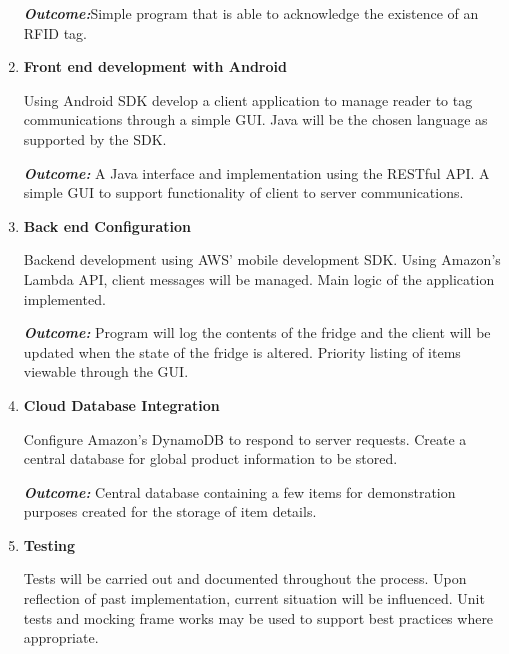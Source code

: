 \documentclass[a4paper, 11pt]{article}
\begin{document}
\begin{enumerate}
\begin{flushleft}
	\emph{\textbf{Outcome:}}Simple program that is able to acknowledge the existence of an RFID tag. 
		  \vspace{\baselineskip}

  	\end{flushleft}
	   \item \textbf{Front end development with Android}
   	\begin{flushleft}Using Android SDK develop a client application to manage reader to tag communications through a simple GUI. Java will be the chosen language as supported by the SDK.
	
	\emph{\textbf{Outcome:}} A Java interface and implementation using the RESTful API. A simple GUI to support functionality of client to server communications. 
	\end{flushleft}
	\vspace{\baselineskip}
 
   \item \textbf{Back end Configuration }
   	\begin{flushleft}Backend development using AWS' mobile development SDK. Using Amazon's Lambda API, client messages will be managed. Main logic of the application implemented.
	
	\emph{\textbf{Outcome:}} Program will log the contents of the fridge and the client will be updated when the state of the fridge is altered. Priority listing of items viewable through the GUI.  
	\vspace{\baselineskip}
  	\end{flushleft}
	   \item \textbf{Cloud Database Integration}
   	\begin{flushleft} Configure Amazon's DynamoDB to respond to server requests. Create a central database for global product information to be stored.
	
	\emph{\textbf{Outcome:}} Central database containing a few items for demonstration purposes created for the storage of item details. 
	\vspace{\baselineskip}
  	\end{flushleft}
	 
   \item \textbf{Testing}
   	\begin{flushleft}Tests will be carried out and documented throughout the process. Upon reflection of past implementation, current situation will be influenced. Unit tests and mocking frame works may be used to support best practices where appropriate.
	  	

\end{flushleft}
\end{enumerate}
\end{document}
